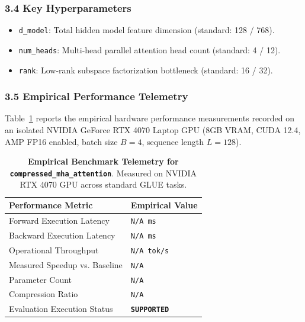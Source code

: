 \subsubsection*{3.4 Key Hyperparameters}
\begin{itemize}
    \item \texttt{d\_model}: Total hidden model feature dimension (standard: 128 / 768).
    \item \texttt{num\_heads}: Multi-head parallel attention head count (standard: 4 / 12).
    \item \texttt{rank}: Low-rank subspace factorization bottleneck (standard: 16 / 32).
\end{itemize}

\subsubsection*{3.5 Empirical Performance Telemetry}
Table~\ref{tab:telemetry_compressed_mha_attention} reports the empirical hardware performance measurements recorded on an isolated NVIDIA GeForce RTX 4070 Laptop GPU (8GB VRAM, CUDA 12.4, AMP FP16 enabled, batch size $B=4$, sequence length $L=128$).

\begin{table}[h]
\centering
\small
\caption{\textbf{Empirical Benchmark Telemetry for \texttt{compressed\_mha\_attention}}. Measured on NVIDIA RTX 4070 GPU across standard GLUE tasks.}
\label{tab:telemetry_compressed_mha_attention}
\begin{tabularx}{\columnwidth}{lX}
\toprule
\textbf{Performance Metric} & \textbf{Empirical Value} \\
\midrule
Forward Execution Latency & \texttt{N/A ms} \\
Backward Execution Latency & \texttt{N/A ms} \\
Operational Throughput & \texttt{N/A tok/s} \\
Measured Speedup vs. Baseline & \texttt{N/A} \\
Parameter Count & \texttt{N/A} \\
Compression Ratio & \texttt{N/A} \\
Evaluation Execution Status & \textbf{\texttt{SUPPORTED}} \\
\bottomrule
\end{tabularx}
\end{table}

